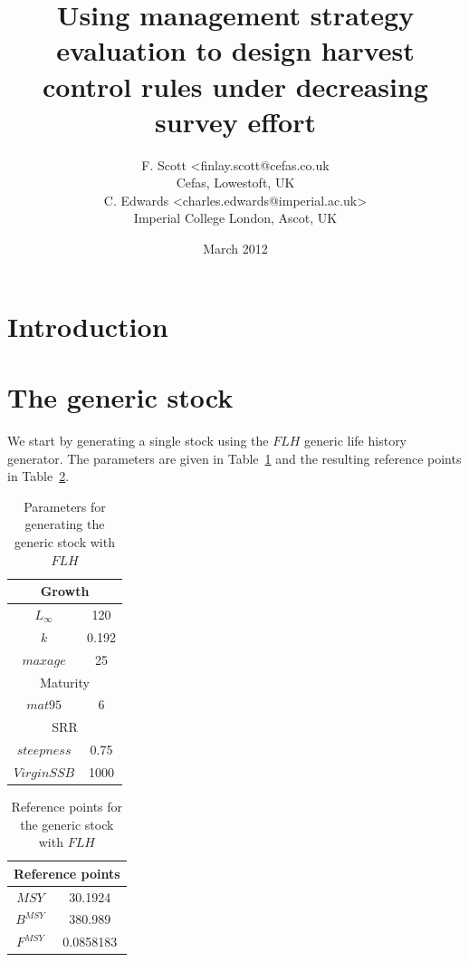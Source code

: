 \documentclass[a4paper]{article}
\begin{document}
\title{Using management strategy evaluation to design harvest control rules under decreasing survey effort}
\author{F. Scott <finlay.scott@cefas.co.uk\\
Cefas, Lowestoft, UK\\
C. Edwards <charles.edwards@imperial.ac.uk>\\
Imperial College London, Ascot, UK}
\date{March 2012}
\maketitle



\section{Introduction}

\section{The generic stock}

We start by generating a single stock using the $FLH$ generic life history generator. 
The parameters are given in Table~\ref{tab:genericStockParams} and the resulting reference points in Table~\ref{tab:genericRefPoints}.


\begin{table}
\centering
\begin{tabular}{|c|c|}
\hline
\multicolumn{2}{|c|}{Growth}\\
\hline
$L_{\infty}$ & 120     \\
$k$          & 0.192        \\
$maxage$     & 25\\
\hline
\multicolumn{2}{|c|}{Maturity}\\
\hline
$mat95$      & 6\\
\hline
\multicolumn{2}{|c|}{SRR}\\
\hline
$steepness$         & 0.75\\
$Virgin SSB$         & 1000\\
\hline
\end{tabular}
\caption{Parameters for generating the generic stock with $FLH$}
\label{tab:genericStockParams}
\end{table}

\begin{table}
\centering
\begin{tabular}{|c|c|}
\hline
\multicolumn{2}{|c|}{Reference points}\\
\hline
$MSY$       & 30.1924\\
$B^{MSY}$   & 380.989\\
$F^{MSY}$   & 0.0858183\\
\hline
\end{tabular}
\caption{Reference points for the generic stock with $FLH$}
\label{tab:genericRefPoints}
\end{table}
\end{document}
